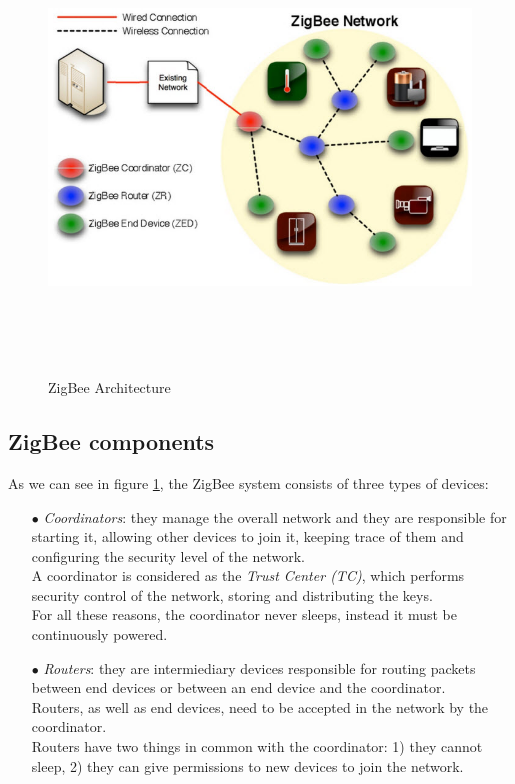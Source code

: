 \documentclass[12pt]{report}
\begin{document}
{{\begin{figure}[H]
\includegraphics[width=12cm,height=12cm,keepaspectratio]{zigbee_architecture}
\centering
\caption{ZigBee Architecture}
\label{fig:zigbeearch}
\end{figure}

\bigskip
\subsection{ZigBee components}
\bigskip

As we can see in figure \ref{fig:zigbeearch}, the ZigBee system consists of three types of devices:

\begin{itemize}
\setlength{\itemindent}{+4mm}
\item[$\bullet$] \emph{Coordinators}: they manage the overall network and they are responsible for starting it, allowing other devices to join it, keeping trace of them and configuring the security level of the network.\\
A coordinator is considered as the \emph{Trust Center (TC)}, which performs security control of the network, storing and distributing the  keys.\\
For all these reasons, the coordinator never sleeps, instead it must be continuously powered.


\item[$\bullet$] \emph{Routers}: they are intermiediary devices responsible for routing packets between end devices or between an end device and the coordinator.\\
Routers, as well as end devices, need to be accepted in the network by the coordinator.\\
Routers have two things in common with the coordinator: 1) they cannot sleep, 2) they can give permissions to new devices to join the network.


\end{itemize}}}
\end{document}
